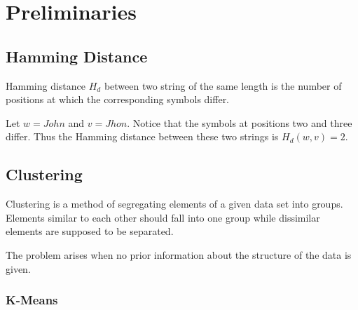 \documentclass{article}
\begin{document}
\newpage




\section{Preliminaries}\label{sec:prelim}



\subsection{Hamming Distance} \label{sec:hamming}

Hamming distance $H_d$ between two string of the same length is the number of positions at which the corresponding symbols differ.

Let $w = John$ and $v = Jhon$. Notice that the symbols at positions two and three differ. Thus the Hamming distance between these two strings is $H_d(w,v) = 2$.

\subsection{Clustering} \label{sec::cluster}

Clustering is a method of segregating elements of a given data set into groups. Elements similar to each other should fall into one group while dissimilar elements are supposed to be separated.

The problem arises when no prior information about the structure of the data is given. 

\subsubsection{K-Means}
\end{document}
